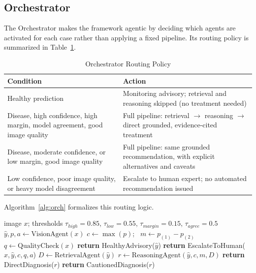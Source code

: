 \documentclass[conference]{IEEEtran}
\begin{document}
\subsection{Orchestrator}
The Orchestrator makes the framework agentic by deciding which agents are activated for each case rather than applying a fixed pipeline. Its routing policy is summarized in Table~\ref{tab:policy}. 

\begin{table}[t]
\centering
\caption{Orchestrator Routing Policy}
\label{tab:policy}
\small
\begin{tabular}{p{3.6cm}p{3.6cm}}
\toprule
\textbf{Condition} & \textbf{Action} \\
\midrule
Healthy prediction & Monitoring advisory; retrieval and reasoning skipped (no treatment needed) \\
Disease, high confidence, high margin, model agreement, good image quality & Full pipeline: retrieval $\rightarrow$ reasoning $\rightarrow$ direct grounded, evidence-cited treatment \\
Disease, moderate confidence, or low margin, good image quality & Full pipeline: same grounded recommendation, with explicit alternatives and caveats \\
Low confidence, poor image quality, or heavy model disagreement & Escalate to human expert; no automated recommendation issued \\
\bottomrule
\end{tabular}
\end{table}

Algorithm~\ref{alg:orch} formalizes this routing logic.

\begin{algorithm}[t]
\caption{Orchestrator Routing Policy}
\label{alg:orch}
\begin{algorithmic}[1]
\REQUIRE image $x$; thresholds $\tau_{high}=0.85$, $\tau_{low}=0.55$, $\tau_{margin}=0.15$, $\tau_{agree}=0.5$
\STATE $\hat{y}, p, a \leftarrow \text{VisionAgent}(x)$ 
\STATE $c \leftarrow \max(p)$; \ $m \leftarrow p_{(1)} - p_{(2)}$ 
\STATE $q \leftarrow \text{QualityCheck}(x)$ 
    \STATE \textbf{return} HealthyAdvisory($\hat{y}$) 
    \STATE \textbf{return} EscalateToHuman($x, \hat{y}, c, q, a$)
\ELSE
    \STATE $D \leftarrow \text{RetrievalAgent}(\hat{y})$ 
    \STATE $r \leftarrow \text{ReasoningAgent}(\hat{y}, c, m, D)$
        \STATE \textbf{return} DirectDiagnosis($r$) 
    \ELSE
        \STATE \textbf{return} CautionedDiagnosis($r$) 
    \ENDIF
\ENDIF
\end{algorithmic}
\end{algorithm}
\end{document}
